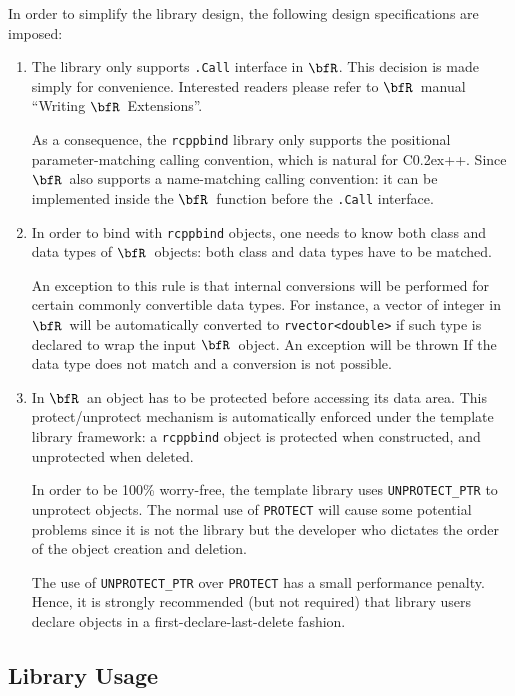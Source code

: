 \documentclass{article}
\def\C++{C{\raise 0.2ex\hbox{++}}}
\newcommand{\R}{$\bfR$}
\begin{document}
In order to simplify the library design, the following
design specifications are imposed:
\begin{enumerate}
  \item The library only supports \texttt{.Call} interface in
    \R. This decision is made simply for convenience.
    Interested readers please refer to \R\ manual ``Writing
    \R\ Extensions''.
  
    As a consequence, the \texttt{rcppbind} library only
    supports the positional parameter-matching calling
    convention, which is natural for \C++. Since \R\
    also supports a name-matching calling convention: it can
    be implemented inside the \R\ function before the
    \texttt{.Call} interface.

  \item In order to bind with \texttt{rcppbind} objects, one
    needs to know both class and data types of \R\ objects:
    both class and data types have to be matched.

    An exception to this rule is that internal conversions
    will be performed for certain commonly convertible data
    types. For instance, a vector of integer in \R\ will be
    automatically converted to \texttt{rvector<double>}
    if such type is declared to wrap the input \R\ object. An
    exception will be thrown If the data type does not match
    and a conversion is not possible.

  \item In \R\, an object has to be protected before
    accessing its data area. This protect/unprotect mechanism
    is automatically enforced under the template library
    framework: a \texttt{rcppbind} object is protected
    when constructed, and unprotected when deleted.
    
    In order to be 100\% worry-free, the template library
    uses \texttt{UNPROTECT\_PTR} to unprotect objects. The
    normal use of \texttt{PROTECT} will cause some potential
    problems since it is not the library but the developer
    who dictates the order of the object creation and
    deletion. 
    
    The use of \texttt{UNPROTECT\_PTR} over \texttt{PROTECT}
    has a small performance penalty. Hence, it is strongly
    recommended (but not required) that library users declare
    objects in a first-declare-last-delete fashion.
\end{enumerate}

\subsection{Library Usage}
\end{document}
